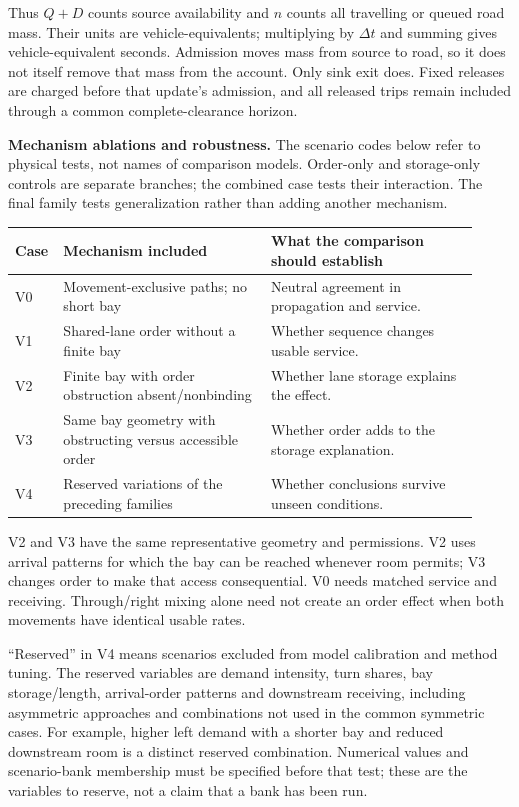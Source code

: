 \documentclass[10pt,a4paper]{article}
\newenvironment{revision}{\begingroup\color{revisionred}}{\par\endgroup}
\begin{document}
\begin{revision}
Thus $Q+D$ counts source availability and $n$ counts all travelling or
queued road mass. Their units are vehicle-equivalents; multiplying by
$\Delta t$ and summing gives vehicle-equivalent seconds. Admission moves
mass from source to road, so it does not itself remove that mass from
the account. Only sink exit does. Fixed releases are charged before
that update's admission, and all released trips remain included through
a common complete-clearance horizon.

\textbf{Mechanism ablations and robustness.} The scenario codes below
refer to physical tests, not names of comparison models. Order-only and
storage-only controls are separate branches; the combined case tests
their interaction. The final family tests generalization rather than
adding another mechanism.
\begin{center}
\setlength{\tabcolsep}{4pt}
\begin{tabular}{@{}>{\raggedright\arraybackslash}p{0.06\linewidth}>{\raggedright\arraybackslash}p{0.43\linewidth}>{\raggedright\arraybackslash}p{0.43\linewidth}@{}}
\toprule
Case & Mechanism included & What the comparison should establish\\
\midrule
V0 & Movement-exclusive paths; no short bay & Neutral agreement in propagation and service.\\
V1 & Shared-lane order without a finite bay & Whether sequence changes usable service.\\
V2 & Finite bay with order obstruction absent/nonbinding & Whether lane storage explains the effect.\\
V3 & Same bay geometry with obstructing versus accessible order & Whether order adds to the storage explanation.\\
V4 & Reserved variations of the preceding families & Whether conclusions survive unseen conditions.\\
\bottomrule
\end{tabular}
\end{center}
V2 and V3 have the same representative geometry and permissions.
V2 uses arrival patterns for which the bay can be reached whenever room
permits; V3 changes order to make that access consequential. V0 needs
matched service and receiving. Through/right mixing alone need not create
an order effect when both movements have identical usable rates.

``Reserved'' in V4 means scenarios excluded from model calibration and
method tuning. The reserved variables are demand intensity, turn shares,
bay storage/length, arrival-order patterns and downstream receiving,
including asymmetric approaches and combinations not used in the common
symmetric cases. For example, higher left demand with a shorter bay and
reduced downstream room is a distinct reserved combination. Numerical
values and scenario-bank membership must be specified before that test;
these are the variables to reserve, not a claim that a bank has been run.


\end{revision}
\end{document}
